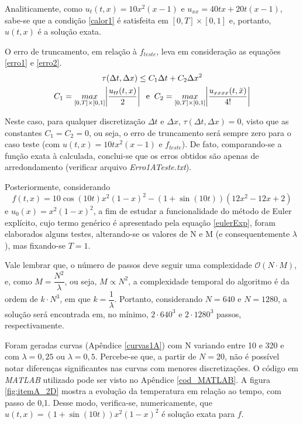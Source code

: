 \documentclass[12pt]{article}
\begin{document}
\begin{spacing}{1.5}
Analiticamente, como $u_{t}(t,x)=10x^{2}(x-1)$ e $u_{xx}=40tx+20t(x - 1)$, sabe-se que a condição \eqref{calor1} é satisfeita em $[0,T]\times[0,1]$ e, portanto, $u(t,x)$ é a solução exata.

O erro de truncamento, em relação à $f_{teste}$, leva em consideração as equações \eqref{erro1} e \eqref{erro2}.
\begin{gather}
\tau(\Delta t,\Delta x) \leq C_{1}\Delta t + C_{2}\Delta x^{2} \label{erro1}\\
C_{1}= \underset{[0,T]\times[0,1]}{max}\abs{\frac{u_{tt}(t,x)}{2}}\;\;\text{e}\;\;C_{2}=\underset{[0,T]\times[0,1]}{max}\abs{\frac{u_{xxxx}(t,\bar{x})}{4!}} \label{erro2}
\end{gather}

Neste caso, para qualquer discretização $\Delta t$ e $\Delta x$, $\tau(\Delta t,\Delta x)=0$, visto que as constantes $C_{1} = C_{2} = 0$, ou seja, o erro de truncamento será sempre zero para o caso teste (com $u(t,x)=10tx^{2}(x-1)$ e $f_{teste}$). De fato, comparando-se a função exata à calculada, conclui-se que os erros obtidos são apenas de arredondamento (verificar arquivo \textit{Erro1ATeste.txt}).

Posteriormente, considerando $$f(t,x)=10\cos(10t)x^{2}(1-x)^{2}-(1+\sin(10t))(12x^{2}-12x+2)$$ e $u_{0}(x)=x^{2}(1-x)^{2}$, a fim de estudar a funcionalidade do método de Euler explícito, cujo termo genérico é apresentado pela equação \eqref{eulerExp}, foram elaborados alguns testes, alterando-se os valores de N e M (e consequentemente $\lambda$), mas fixando-se $T = 1$.

Vale lembrar que, o número de passos deve seguir uma complexidade $\mathcal{O}(N{\cdot} M)$, e, como $M =\dfrac{N^2}{\lambda}$, ou seja, $M\propto N^{2}$, a complexidade temporal do algoritmo é da ordem de $k{\cdot}N^{3}$, em que $k = \dfrac{1}{\lambda}$. Portanto, considerando $N=640$ e $N=1280$, a solução será encontrada em, no mínimo, $2\cdot 640^{3}$ e $2\cdot 1280^{3}$ passos, respectivamente.

Foram geradas curvas (Apêndice \ref{curvas1A}) com N variando entre 10 e 320 e com $\lambda=0,25$ ou $\lambda=0,5$. Percebe-se que, a partir de $N=20$, não é possível notar diferenças significantes nas curvas com menores discretizações. O código em \textit{MATLAB} utilizado pode ser visto no Apêndice \ref{cod_MATLAB}. A figura \ref{fig:itemA_2D} mostra a evolução da temperatura em relação ao tempo, com passo de 0,1. Desse modo, verifica-se, numericamente, que $u(t,x)=(1 +\sin(10t))x^{2}(1-x)^{2}$ é solução exata para $f$.


\end{spacing}
\end{document}
